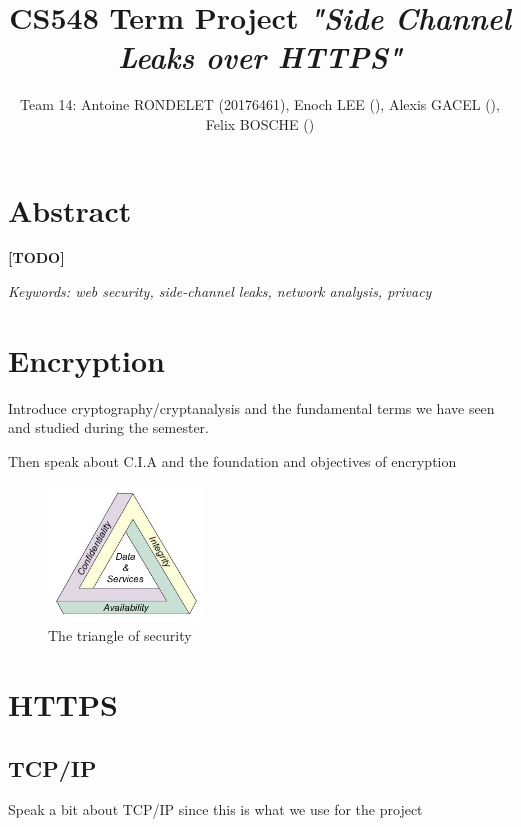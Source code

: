 \documentclass[journal]{IEEEtran}
\begin{document}
\title{CS548 Term Project \emph{"Side Channel Leaks over HTTPS"}}

\author{Team 14: Antoine RONDELET (20176461), Enoch LEE (), Alexis GACEL (), Felix BOSCHE ()}
\maketitle
\IEEEpeerreviewmaketitle

\section*{Abstract}

\textbf{[TODO]}

\bigskip

\emph{Keywords: web security, side-channel leaks, network analysis, privacy}

\section{Encryption}

Introduce cryptography/cryptanalysis and the fundamental terms we have seen and studied during the semester.

Then speak about C.I.A and the foundation and objectives of encryption

\begin{figure}[h]
\centering
\includegraphics[width=0.37\textwidth]{images/cia.png}
\caption{The triangle of security}
\label{fig:dbBuilder}
\end{figure}

\medskip

\section{HTTPS}

\subsection{TCP/IP}
Speak a bit about TCP/IP since this is what we use for the project
\end{document}
